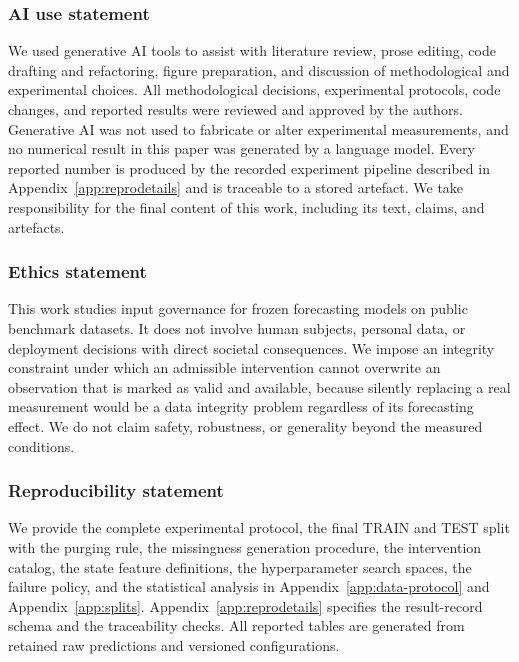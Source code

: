 \documentclass{article}
\begin{document}
\subsubsection*{AI use statement}
We used generative AI tools to assist with literature review, prose editing, code drafting and
refactoring, figure preparation, and discussion of methodological and experimental choices.
All methodological decisions, experimental protocols, code changes, and reported results were
reviewed and approved by the authors. Generative AI was not used to fabricate or alter
experimental measurements, and no numerical result in this paper was generated by a language
model. Every reported number is produced by the recorded experiment pipeline described in
Appendix~\ref{app:reprodetails} and is traceable to a stored artefact. We take responsibility
for the final content of this work, including its text, claims, and artefacts.

\subsubsection*{Ethics statement}
This work studies input governance for frozen forecasting models on public benchmark datasets.
It does not involve human subjects, personal data, or deployment decisions with direct
societal consequences. We impose an integrity constraint under which an admissible
intervention cannot overwrite an observation that is marked as valid and available, because
silently replacing a real measurement would be a data integrity problem regardless of its
forecasting effect. We do not claim safety, robustness, or generality beyond the measured
conditions.

\subsubsection*{Reproducibility statement}
We provide the complete experimental protocol, the final TRAIN and TEST split with the
purging rule, the missingness generation procedure, the intervention catalog, the state
feature definitions, the hyperparameter search spaces, the failure policy, and the statistical
analysis in Appendix~\ref{app:data-protocol} and Appendix~\ref{app:splits}.
Appendix~\ref{app:reprodetails} specifies the result-record schema and the traceability checks.
All reported tables are generated from retained raw predictions and versioned configurations.



\end{document}
